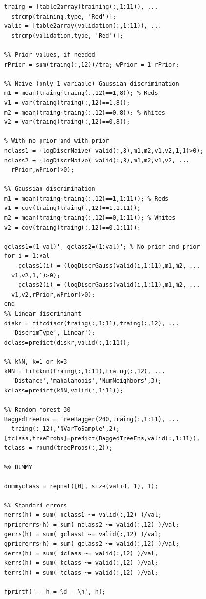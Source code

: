\documentclass[twoside]{article}
\begin{document}
\begin{multicols}{2}
{\begin{verbatim}
    traing = [table2array(training(:,1:11)), ... 
      strcmp(training.type, 'Red')];
    valid = [table2array(validation(:,1:11)), ... 
      strcmp(validation.type, 'Red')];

    %% Prior values, if needed
    rPrior = sum(traing(:,12))/tra; wPrior = 1-rPrior;

    %% Naive (only 1 variable) Gaussian discrimination
    m1 = mean(traing(traing(:,12)==1,8)); % Reds
    v1 = var(traing(traing(:,12)==1,8));
    m2 = mean(traing(traing(:,12)==0,8)); % Whites
    v2 = var(traing(traing(:,12)==0,8));

    % With no prior and with prior
    nclass1 = (logDiscrNaive( valid(:,8),m1,m2,v1,v2,1,1)>0);
    nclass2 = (logDiscrNaive( valid(:,8),m1,m2,v1,v2, ... 
      rPrior,wPrior)>0);

    %% Gaussian discrimination
    m1 = mean(traing(traing(:,12)==1,1:11)); % Reds
    v1 = cov(traing(traing(:,12)==1,1:11));
    m2 = mean(traing(traing(:,12)==0,1:11)); % Whites
    v2 = cov(traing(traing(:,12)==0,1:11));

    gclass1=(1:val)'; gclass2=(1:val)'; % No prior and prior
    for i = 1:val
        gclass1(i) = (logDiscrGauss(valid(i,1:11),m1,m2, ... 
	  v1,v2,1,1)>0);
        gclass2(i) = (logDiscrGauss(valid(i,1:11),m1,m2, ...
	  v1,v2,rPrior,wPrior)>0);
    end 
    %% Linear discriminant
    diskr = fitcdiscr(traing(:,1:11),traing(:,12), ...
      'DiscrimType','Linear');
    dclass=predict(diskr,valid(:,1:11));

    %% kNN, k=1 or k=3
    kNN = fitcknn(traing(:,1:11),traing(:,12), ...
      'Distance','mahalanobis','NumNeighbors',3);
    kclass=predict(kNN,valid(:,1:11));

    %% Random forest 30
    BaggedTreeEns = TreeBagger(200,traing(:,1:11), ...
      traing(:,12),'NVarToSample',2);
    [tclass,treeProbs]=predict(BaggedTreeEns,valid(:,1:11));
    tclass = round(treeProbs(:,2));
    
    %% DUMMY

    dummyclass = repmat([0], size(valid, 1), 1);

    %% Standard errors
    nerrs(h) = sum( nclass1 ~= valid(:,12) )/val;
    npriorerrs(h) = sum( nclass2 ~= valid(:,12) )/val;
    gerrs(h) = sum( gclass1 ~= valid(:,12) )/val;
    gpriorerrs(h) = sum( gclass2 ~= valid(:,12) )/val;
    derrs(h) = sum( dclass ~= valid(:,12) )/val;
    kerrs(h) = sum( kclass ~= valid(:,12) )/val;
    terrs(h) = sum( tclass ~= valid(:,12) )/val;

    fprintf('-- h = %d --\n', h);


\end{verbatim}}
\end{multicols}
\end{document}
